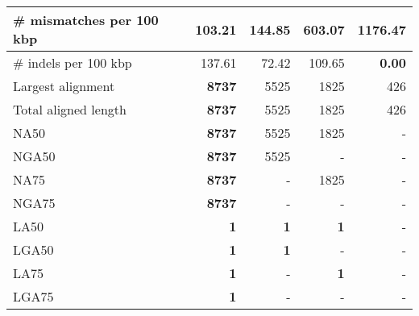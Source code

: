 \documentclass[12pt,a4paper]{article}
\begin{document}
\begin{table}[ht]
\begin{center}
\begin{tabular}{|l*{4}{|r}|}
\# mismatches per 100 kbp & {\bf 103.21} & 144.85 & 603.07 & 1176.47 \\ \hline
\# indels per 100 kbp & 137.61 & 72.42 & 109.65 & {\bf 0.00} \\ \hline
Largest alignment & {\bf 8737} & 5525 & 1825 & 426 \\ \hline
Total aligned length & {\bf 8737} & 5525 & 1825 & 426 \\ \hline
NA50 & {\bf 8737} & 5525 & 1825 & - \\ \hline
NGA50 & {\bf 8737} & 5525 & - & - \\ \hline
NA75 & {\bf 8737} & - & 1825 & - \\ \hline
NGA75 & {\bf 8737} & - & - & - \\ \hline
LA50 & {\bf 1} & {\bf 1} & {\bf 1} & - \\ \hline
LGA50 & {\bf 1} & {\bf 1} & - & - \\ \hline
LA75 & {\bf 1} & - & {\bf 1} & - \\ \hline
LGA75 & {\bf 1} & - & - & - \\ \hline
\end{tabular}
\end{center}
\end{table}
\end{document}
